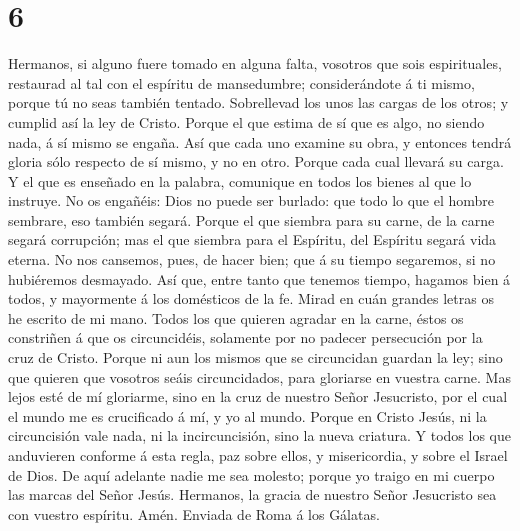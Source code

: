\hypertarget{section-5}{%
\section{6}\label{section-5}}

 Hermanos, si alguno fuere tomado en alguna falta,
vosotros que sois espirituales, restaurad al tal con el espíritu de
mansedumbre; considerándote á ti mismo, porque tú no seas también
tentado.  Sobrellevad los unos las cargas de los otros; y
cumplid así la ley de Cristo.  Porque el que estima de sí
que es algo, no siendo nada, á sí mismo se engaña.  Así
que cada uno examine su obra, y entonces tendrá gloria sólo respecto de
sí mismo, y no en otro.  Porque cada cual llevará su
carga.  Y el que es enseñado en la palabra, comunique en
todos los bienes al que lo instruye.  No os engañéis: Dios
no puede ser burlado: que todo lo que el hombre sembrare, eso también
segará.  Porque el que siembra para su carne, de la carne
segará corrupción; mas el que siembra para el Espíritu, del Espíritu
segará vida eterna.  No nos cansemos, pues, de hacer bien;
que á su tiempo segaremos, si no hubiéremos desmayado. 
Así que, entre tanto que tenemos tiempo, hagamos bien á todos, y
mayormente á los domésticos de la fe.  Mirad en cuán
grandes letras os he escrito de mi mano.  Todos los que
quieren agradar en la carne, éstos os constriñen á que os circuncidéis,
solamente por no padecer persecución por la cruz de Cristo.
 Porque ni aun los mismos que se circuncidan guardan la
ley; sino que quieren que vosotros seáis circuncidados, para gloriarse
en vuestra carne.  Mas lejos esté de mí gloriarme, sino
en la cruz de nuestro Señor Jesucristo, por el cual el mundo me es
crucificado á mí, y yo al mundo.  Porque en Cristo Jesús,
ni la circuncisión vale nada, ni la incircuncisión, sino la nueva
criatura.  Y todos los que anduvieren conforme á esta
regla, paz sobre ellos, y misericordia, y sobre el Israel de Dios.
 De aquí adelante nadie me sea molesto; porque yo traigo
en mi cuerpo las marcas del Señor Jesús.  Hermanos, la
gracia de nuestro Señor Jesucristo sea con vuestro espíritu. Amén.
Enviada de Roma á los Gálatas.
